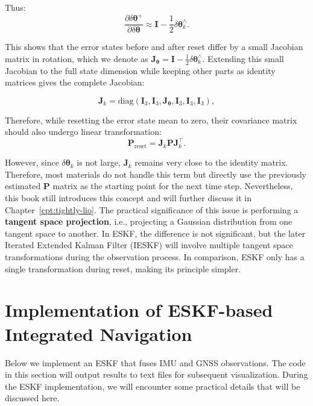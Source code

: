 Thus:
\begin{equation}\label{eq:jacobian-derivation}
	\frac{\partial \delta \boldsymbol{\theta}^+}{\partial \delta \boldsymbol{\theta}} \approx \bm{I} - \frac{1}{2} \delta \boldsymbol{\theta}_k^\wedge .
\end{equation}

This shows that the error states before and after reset differ by a small Jacobian matrix in rotation, which we denote as $\bm{J}_{\boldsymbol{\theta}} = \bm{I} - \frac{1}{2} \delta \boldsymbol{\theta}_k^\wedge $. Extending this small Jacobian to the full state dimension while keeping other parts as identity matrices gives the complete Jacobian:

\begin{equation}\label{eq:full-jacobian}
	\bm{J}_k = \mathrm{diag}(\bm{I}_3, \bm{I}_3, \bm{J}_{\boldsymbol{\theta}}, \bm{I}_3, \bm{I}_3, \bm{I}_3),
\end{equation}

Therefore, while resetting the error state mean to zero, their covariance matrix should also undergo linear transformation:
\begin{equation}\label{eq:tangent-space-projection}
	\bm{P}_{\mathrm{reset}} = \bm{J}_k \bm{P} \bm{J}_k^\top.
\end{equation}

However, since $\delta \boldsymbol{\theta}_k$ is not large, $\bm{J}_k$ remains very close to the identity matrix. Therefore, most materials do not handle this term but directly use the previously estimated $\bm{P}$ matrix as the starting point for the next time step. Nevertheless, this book still introduces this concept and will further discuss it in Chapter~\ref{cpt:tightly-lio}. The practical significance of this issue is performing a \textbf{tangent space projection}, i.e., projecting a Gaussian distribution from one tangent space to another. In ESKF, the difference is not significant, but the later Iterated Extended Kalman Filter (IESKF) will involve multiple tangent space transformations during the observation process. In comparison, ESKF only has a single transformation during reset, making its principle simpler.
\section{Implementation of ESKF-based Integrated Navigation}

Below we implement an ESKF that fuses IMU and GNSS observations. The code in this section will output results to text files for subsequent visualization. During the ESKF implementation, we will encounter some practical details that will be discussed here.

